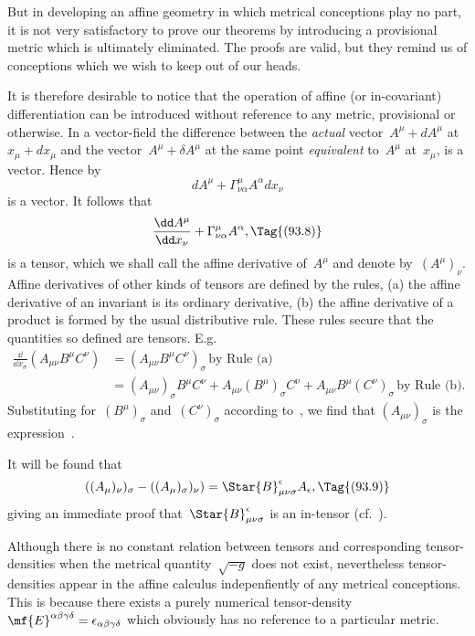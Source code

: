 \documentclass[12pt]{book}
\begin{document}
But in developing an affine geometry in which metrical conceptions play no part, it is not very satisfactory
to prove our theorems by introducing a provisional metric which is ultimately eliminated.
The proofs are valid, but they remind us of conceptions which we wish to keep out of our heads.

It is therefore desirable to notice that the operation of affine (or in\hyp{}covariant) differentiation can be
introduced without reference to any metric, provisional or otherwise.
In a vector\hyp{}field the difference between the \emph{actual} vector~$A^\mu + dA^\mu$ at~$x_\mu+dx_\mu$
and the vector~$A^\mu+\delta A^\mu$ at the same point \emph{equivalent} to~$A^\mu$ at~$x_\mu$, is a vector.
Hence by~
\[
dA^\mu + \Gamma^\mu_{\nu\alpha} A^\alpha dx_\nu
\]
is a vector.
It follows that
\[
\frac{\dd A^\mu}{\dd x_\nu} + \Gamma^\mu_{\nu\alpha}A^\alpha,
\Tag{(93.8)}
\]
is a tensor, which we shall call the affine derivative of~$A^\mu$ and denote by~$(A^\mu)_\nu$.
Affine derivatives of other kinds of tensors are defined by the rules,
(a) the affine derivative of an invariant is its ordinary derivative,
(b) the affine derivative of a product is formed by the usual distributive rule.
These rules secure that the quantities so defined are tensors. E.g.
\begin{align*}
\frac{\dd}{\dd x_\sigma}(A_{\mu\nu} B^\mu C^\nu) & = (A_{\mu\nu} B^\mu C^\nu)_\sigma \, \text{by Rule (a)}\\
 & = (A_{\mu\nu})_\sigma B^\mu C^\nu + A_{\mu\nu} (B^\mu)_\sigma C^\nu + A_{\mu\nu} B^\mu (C^\nu)_\sigma \, \text{by Rule (b)}.
\end{align*}
Substituting for~$(B^\mu)_\sigma$ and~$(C^\nu)_\sigma$ according to~,
we find that $(A_{\mu\nu})_\sigma$ is the expression~.

It will be found that
\[
((A_\mu)_\nu)_\sigma - ((A_\mu)_\sigma)_\nu) = \Star{B}^\epsilon_{\mu\nu\sigma}A_\epsilon,
\Tag{(93.9)}
\]
giving an immediate proof that~$\Star{B}^\epsilon_{\mu\nu\sigma}$ is an in\hyp{}tensor (cf.~).

Although there is no constant relation between tensors and corresponding tensor\hyp{}densities when the
metrical quantity~$\sqrt{-g}$ does not exist, nevertheless tensor\hyp{}densities appear in the affine calculus
indepenfiently of any metrical conceptions.
This is because there exists a purely numerical
tensor\hyp{}density~$\mf{E}^{\alpha\beta\gamma\delta}=\epsilon_{\alpha\beta\gamma\delta}$  which
obviously has no reference to a particular metric.
\end{document}
